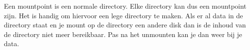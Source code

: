 Een mountpoint is een normale directory. Elke directory kan dus een mountpoint zijn. Het is handig om hiervoor een lege directory te maken. Als er al data in de directory staat en je mount op de directory een andere disk dan is de inhoud van de directory niet meer bereikbaar. Pas na het unmounten kan je dan weer bij je data.

